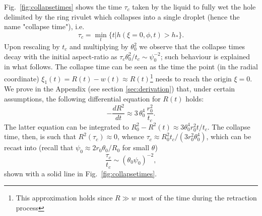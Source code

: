 \documentclass[twoside,twocolumn,9pt]{article}
\begin{document}
Fig.~\ref{fig:collapsetimes} shows the time $\tau_c$ taken by the liquid to fully wet the hole delimited by the ring rivulet which collapses into a single droplet (hence the name "collapse time"), i.e. 
\begin{equation}\label{eq:collapsetime}
\tau_c = \min_t \{t | h(\xi=0,\phi,t) > h_{\ast}\}.
\end{equation}
Upon rescaling by $t_c$ and multiplying by $\theta_0^2$ we observe that the collapse times decay with the initial aspect-ratio as $\tau_c \theta_0^2/t_c \sim \psi_0^{-2}$; such behaviour is explained in what follows.
The collapse time can be seen as the time the point (in the radial coordinate) $\xi_1(t) = R(t) - w(t) \approx R(t)$\footnote{This approximation holds since $R \gg w$ most of the time during the retraction process} needs to reach the origin $\xi = 0$. 
We prove in the Appendix (see section \ref{sec:derivation}) that, under certain assumptions, the following differential equation for $R(t)$ holds:
\begin{equation}\label{eq:modelC4}
-\frac{d R^2}{dt} \approx 3 \, \theta_0^4 \, \frac{r_0^2}{t_c}.
\end{equation}
The latter equation can be integrated to $R_0^2 - R^2(t) \approx 3 \theta_0^4 r_0^2 t/t_c$.
The collapse time, then, is such that $R^2(\tau_c) \approx 0$, whence $\tau_c  \approx R_0^2 t_c/(3 r_0^2 \theta_0^4)$, which can be recast into (recall that $\psi_0 \approx 2 r_0 \theta_0/R_0$ for small $\theta$) 
\begin{equation}\label{eq:modeltauc}
\frac{\tau_c}{t_c} \sim  (\theta_0 \psi_0)^{-2},
\end{equation}
shown with a solid line in Fig.~\ref{fig:collapsetimes}.
\end{document}
